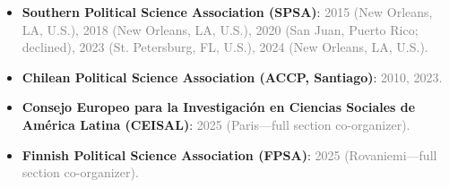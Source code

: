 \begin{itemize}
\item[\textcolor{gray}{\textbullet}] {\bf Southern Political Science Association (SPSA)}: \textcolor{gray}{2015 (New Orleans, LA, U.S.), 2018 (New Orleans, LA, U.S.), 2020 (San Juan, Puerto Rico; declined), 2023 (St. Petersburg, FL, U.S.), 2024 (New Orleans, LA, U.S.).}
\item[\textcolor{gray}{\textbullet}] {\bf Chilean Political Science Association (ACCP, Santiago)}: \textcolor{gray}{2010, 2023.}
\item[\textcolor{gray}{\textbullet}] {\bf Consejo Europeo para la Investigaci\'on en Ciencias Sociales de Am\'erica Latina (CEISAL)}: \textcolor{gray}{2025 (Paris---full section co-organizer).}
\item[\textcolor{gray}{\textbullet}] {\bf Finnish Political Science Association (FPSA)}: \textcolor{gray}{2025 (Rovaniemi---full section co-organizer).}



\end{itemize}
